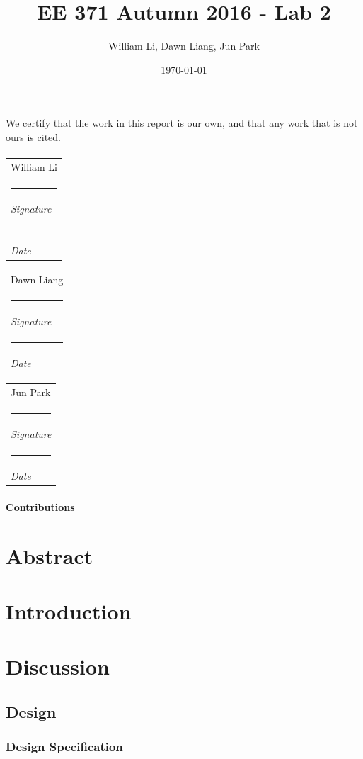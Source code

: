 \documentclass{article}
\title{EE 371 Autumn 2016 - Lab 2}
\date{\today}
\author{William Li, Dawn Liang, Jun Park}
\begin{document}
\newcommand{\namesigdate}[2][5cm]{
  \begin{tabular}{@{}p{#1}@{}}
    #2 \\[2\normalbaselineskip] \hrule \\[0pt]
    {\small \textit{Signature}} \\[2\normalbaselineskip] \hrule \\[0pt]
    {\small \textit{Date}}
  \end{tabular}
}

\maketitle
\newpage

\paragraph{} We certify that the work in this report is our own, and that any work that is not ours is cited.

\paragraph{} \noindent \namesigdate{William Li} \hfill \namesigdate{Dawn Liang} \hfill \namesigdate{Jun Park}
\newpage

\paragraph{Contributions}

\tableofcontents
\newpage


\section{Abstract}


\section{Introduction}


\section{Discussion}
\subsection{Design}
\subsubsection{Design Specification}
\end{document}
